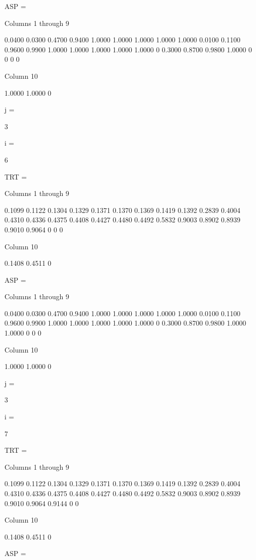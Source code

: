 ASP =

  Columns 1 through 9

    0.0400    0.0300    0.4700    0.9400    1.0000    1.0000    1.0000    1.0000    1.0000
    0.0100    0.1100    0.9600    0.9900    1.0000    1.0000    1.0000    1.0000    1.0000
         0    0.3000    0.8700    0.9800    1.0000         0         0         0         0

  Column 10

    1.0000
    1.0000
         0


j =

     3


i =

     6


TRT =

  Columns 1 through 9

    0.1099    0.1122    0.1304    0.1329    0.1371    0.1370    0.1369    0.1419    0.1392
    0.2839    0.4004    0.4310    0.4336    0.4375    0.4408    0.4427    0.4480    0.4492
    0.5832    0.9003    0.8902    0.8939    0.9010    0.9064         0         0         0

  Column 10

    0.1408
    0.4511
         0


ASP =

  Columns 1 through 9

    0.0400    0.0300    0.4700    0.9400    1.0000    1.0000    1.0000    1.0000    1.0000
    0.0100    0.1100    0.9600    0.9900    1.0000    1.0000    1.0000    1.0000    1.0000
         0    0.3000    0.8700    0.9800    1.0000    1.0000         0         0         0

  Column 10

    1.0000
    1.0000
         0


j =

     3


i =

     7


TRT =

  Columns 1 through 9

    0.1099    0.1122    0.1304    0.1329    0.1371    0.1370    0.1369    0.1419    0.1392
    0.2839    0.4004    0.4310    0.4336    0.4375    0.4408    0.4427    0.4480    0.4492
    0.5832    0.9003    0.8902    0.8939    0.9010    0.9064    0.9144         0         0

  Column 10

    0.1408
    0.4511
         0


ASP =

